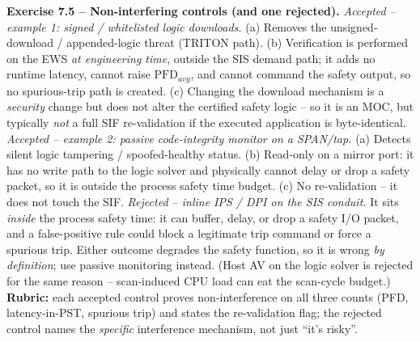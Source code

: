 \documentclass[11pt,a4paper]{article}
\begin{document}
\begin{solutionbox}
\textbf{Exercise 7.5 -- Non-interfering controls (and one rejected).}
\emph{Accepted -- example 1: signed / whitelisted logic downloads.}
(a) Removes the unsigned-download / appended-logic threat (TRITON path).
(b) Verification is performed on the EWS \emph{at engineering time}, outside
the SIS demand path; it adds no runtime latency, cannot raise
$\mathrm{PFD}_{avg}$, and cannot command the safety output, so no spurious-trip
path is created. (c) Changing the download mechanism is a \emph{security}
change but does not alter the certified safety logic -- so it is an MOC, but
typically \emph{not} a full SIF re-validation if the executed application is
byte-identical.
\emph{Accepted -- example 2: passive code-integrity monitor on a SPAN/tap.}
(a) Detects silent logic tampering / spoofed-healthy status. (b) Read-only on a
mirror port: it has no write path to the logic solver and physically cannot
delay or drop a safety packet, so it is outside the process safety time budget.
(c) No re-validation -- it does not touch the SIF.
\emph{Rejected -- inline IPS / DPI on the SIS conduit.} It sits \emph{inside}
the process safety time: it can buffer, delay, or drop a safety I/O packet, and
a false-positive rule could block a legitimate trip command or force a
spurious trip. Either outcome degrades the safety function, so it is wrong
\emph{by definition}; use passive monitoring instead. (Host AV on the logic
solver is rejected for the same reason -- scan-induced CPU load can eat the
scan-cycle budget.)
\textbf{Rubric:} each accepted control proves non-interference on all three
counts (PFD, latency-in-PST, spurious trip) and states the re-validation flag;
the rejected control names the \emph{specific} interference mechanism, not just
``it's risky''.
\end{solutionbox}
\end{document}
